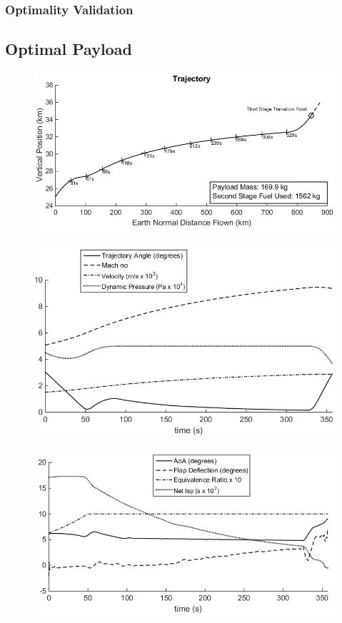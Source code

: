 \subsubsection{Optimality Validation}


\subsection{Optimal Payload}
\begin{figure}
\centering
\includegraphics[width=0.7\linewidth]{figures/5_Ascent/qlimited50kpa}
\caption{}
\label{fig:qlimited50kpa}
\end{figure}
\begin{figure}
\centering
\includegraphics[width=0.7\linewidth]{figures/5_Ascent/qlimited50kpa-Aero}
\caption{}
\label{fig:qlimited50kpa-Aero}
\end{figure}
\begin{figure}
\centering
\includegraphics[width=0.7\linewidth]{figures/5_Ascent/qlimited-Vehicle}
\caption{}
\label{fig:qlimited-Vehicle}
\end{figure}

